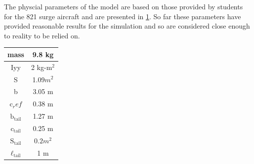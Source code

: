 \documentclass{article}
\begin{document}
The physcial parameters of the model are based on those provided by students for the 821 surge aircraft and are presented in \cref{tbl:aircraft-params}. 
So far these parameters have provided reasonable results for the simulation and so are considered close enough to reality to be relied on. 

\begin{table}[!h]
	\centering
		\label{tbl:aircraft-params}
	\begin{tabular}{|c|c|}
		\hline
		\hline
		mass & 9.8 kg\\
		\hline
		Iyy & 2 kg-$\mathrm{m}^2$\\
		\hline
		S & 1.09$m^2$ \\
		\hline
		b & 3.05 m\\
		\hline
		$\mathrm{c}_ref$ & 0.38 m\\
		\hline
		$\mathrm{b}_\mathrm{tail}$ & 1.27 m\\
		\hline
		$\mathrm{c}_\mathrm{tail}$ & 0.25 m\\
		\hline
		$\mathrm{S}_\mathrm{tail}$ & $0.2 m^2$\\
		\hline 
		$\ell_\mathrm{tail}$ & 1 m  \\
		\hline
		\hline
	\end{tabular}

\end{table}
\end{document}
